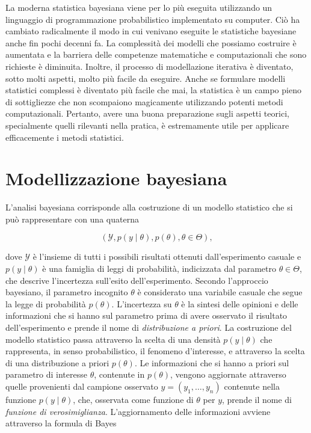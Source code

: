 \documentclass[
  11pt,
]{krantz}
\theoremstyle{definition}
\theoremstyle{definition}
\theoremstyle{definition}
\theoremstyle{definition}
\theoremstyle{remark}
\begin{document}
La moderna statistica bayesiana viene per lo più eseguita utilizzando un linguaggio di programmazione probabilistico implementato su computer. Ciò ha cambiato radicalmente il modo in cui venivano eseguite le statistiche bayesiane anche fin pochi decenni fa. La complessità dei modelli che possiamo costruire è aumentata e la barriera delle competenze matematiche e computazionali che sono richieste è diminuita. Inoltre, il processo di modellazione iterativa è diventato, sotto molti aspetti, molto più facile da eseguire. Anche se formulare modelli statistici complessi è diventato più facile che mai, la statistica è un campo pieno di sottigliezze che non scompaiono magicamente utilizzando potenti metodi computazionali. Pertanto, avere una buona preparazione sugli aspetti teorici, specialmente quelli rilevanti nella pratica, è estremamente utile per applicare efficacemente i metodi statistici.

\hypertarget{modellizzazione-bayesiana}{%
\section{Modellizzazione bayesiana}\label{modellizzazione-bayesiana}}

L'analisi bayesiana corrisponde alla costruzione di un modello statistico che si può rappresentare con una quaterna

\begin{equation}
(\mathcal{Y}, p(y \mid \theta), p(\theta), \theta \in \Theta),
\end{equation}

dove \(\mathcal{Y}\) è l'insieme di tutti i possibili risultati ottenuti dall'esperimento casuale e \(p(y \mid \theta)\) è una famiglia di leggi di probabilità, indicizzata dal parametro \(\theta \in \Theta\), che descrive l'incertezza sull'esito dell'esperimento. Secondo l'approccio bayesiano, il parametro incognito \(\theta\) è considerato una variabile casuale che segue la legge di probabilità \(p(\theta)\). L'incertezza su \(\theta\) è la sintesi delle opinioni e delle informazioni che si hanno sul parametro prima di avere osservato il risultato dell'esperimento e prende il nome di \emph{distribuzione a priori}. La costruzione del modello statistico passa attraverso la scelta di una densità \(p(y \mid \theta)\) che rappresenta, in senso probabilistico, il fenomeno d'interesse, e attraverso la scelta di una distribuzione a priori \(p(\theta)\). Le informazioni che si hanno a priori sul parametro di interesse \(\theta\), contenute in \(p(\theta)\), vengono aggiornate attraverso quelle provenienti dal campione osservato \(y = (y_1, \dots, y_n)\) contenute nella funzione \(p(y \mid \theta)\), che, osservata come funzione di \(\theta\) per \(y\), prende il nome di \emph{funzione di verosimiglianza}. L'aggiornamento delle informazioni avviene attraverso la formula di Bayes
\end{document}
